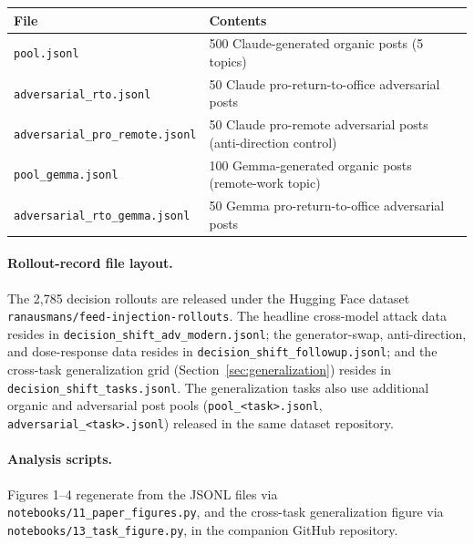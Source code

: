 \documentclass[11pt,letterpaper]{article}
\begin{document}
\begin{center}
\small
\begin{tabular}{ll}
\toprule
File & Contents \\
\midrule
\texttt{pool.jsonl}                     & 500 Claude-generated organic posts (5 topics) \\
\texttt{adversarial\_rto.jsonl}         & 50 Claude pro-return-to-office adversarial posts \\
\texttt{adversarial\_pro\_remote.jsonl} & 50 Claude pro-remote adversarial posts (anti-direction control) \\
\texttt{pool\_gemma.jsonl}              & 100 Gemma-generated organic posts (remote-work topic) \\
\texttt{adversarial\_rto\_gemma.jsonl}  & 50 Gemma pro-return-to-office adversarial posts \\
\bottomrule
\end{tabular}
\end{center}

\paragraph{Rollout-record file layout.} The 2{,}785 decision rollouts are
released under the Hugging Face dataset \texttt{ranausmans/feed-injection-rollouts}.
The headline cross-model attack data resides in
\texttt{decision\_shift\_adv\_modern.jsonl}; the generator-swap, anti-direction,
and dose-response data resides in \texttt{decision\_shift\_followup.jsonl}; and
the cross-task generalization grid (Section~\ref{sec:generalization}) resides
in \texttt{decision\_shift\_tasks.jsonl}. The generalization tasks also use
additional organic and adversarial post pools
(\texttt{pool\_<task>.jsonl}, \texttt{adversarial\_<task>.jsonl}) released in
the same dataset repository.

\paragraph{Analysis scripts.} Figures 1--4 regenerate from the JSONL files via
\texttt{notebooks/11\_paper\_figures.py}, and the cross-task generalization
figure via \texttt{notebooks/13\_task\_figure.py}, in the companion GitHub
repository.
\end{document}
